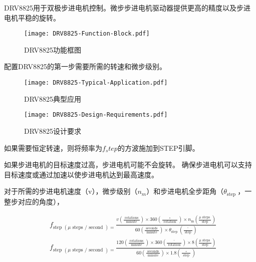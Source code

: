 DRV8825用于双极步进电机控制。微步步进电机驱动器提供更高的精度以及步进电机平稳的旋转。

\begin{figure}[htbp]
    \centering
    \texttt{[image: DRV8825-Function-Block.pdf]}
    \caption{DRV8825功能框图}
    \label{fig:DRV8825-Function-Block}
\end{figure}

配置DRV8825的第一步需要所需的转速和微步级别。

\begin{figure}[htbp]
    \centering
    \texttt{[image: DRV8825-Typical-Application.pdf]}
    \caption{DRV8825典型应用}
    \label{fig:DRV8825-Typical-Application}
\end{figure}


\begin{figure}[htbp]
    \centering
    \texttt{[image: DRV8825-Design-Requirements.pdf]}
    \caption{DRV8825设计要求}
    \label{fig:DRV8825-Design-Requirements}
\end{figure}

如果需要恒定转速，则将频率为$f_step$的方波施加到STEP引脚。

如果步进电机的目标速度过高，步进电机可能不会旋转。 确保步进电机可以支持目标速度或通过加速以使步进电机达到最高速度。

对于所需的步进电机速度（v），微步级别（$n_m$）和步进电机全步距角（$\theta_{\text {step }}$，一整步对应的角度），

\begin{equation}
    \begin{aligned}
    &f_{\text {step }(\mu \text { steps } / \text { second })=} \frac{v\left(\frac{\text { rotations }}{\text { minute }}\right) \times 360\left(\frac{\circ}{\text { rotation }}\right) \times n_{\mathrm{m}}\left(\frac{\mu \text { steps }}{\text { step }}\right)}{60\left(\frac{\text { seconds }}{\text { minute }}\right) \times \theta_{\text {step }}\left(\frac{^{\circ}}{\text { step }}\right)}\\
    &f_{\text {step }(\mu \text { steps } / \text { second })=} \frac{120\left(\frac{\text { rotations }}{\text { minute }}\right) \times 360\left(\frac{^{\circ}}{\text { rotation }}\right) \times 8\left(\frac{\mu \text { steps }}{\text { step }}\right)}{60\left(\frac{\text { seconds }}{\text { minute }}\right) \times 1.8\left(\frac{\circ}{\text { step }}\right)}
    \end{aligned}
\end{equation}

